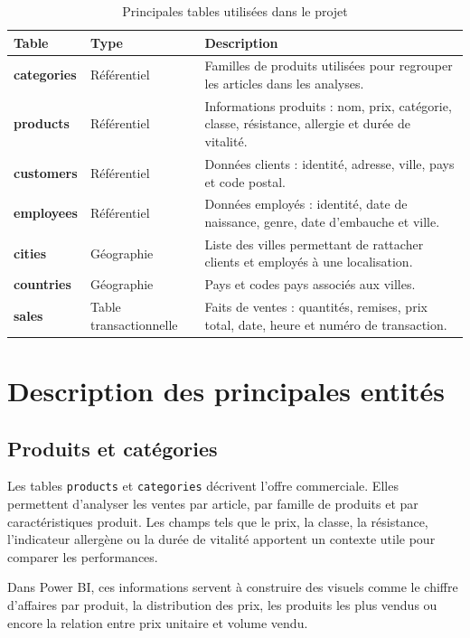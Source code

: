 \documentclass[12pt,a4paper,twoside]{report}
\begin{document}
\begin{table}[H]
\centering
{}
\begin{tabularx}{\textwidth}{>{\bfseries}p{3.1cm}p{3.2cm}X}
\toprule
\rowcolor{TableHeader}
\color{white}Table & \color{white}Type & \color{white}Description \\
\midrule
categories & Référentiel & Familles de produits utilisées pour regrouper les articles dans les analyses. \\
products & Référentiel & Informations produits : nom, prix, catégorie, classe, résistance, allergie et durée de vitalité. \\
customers & Référentiel & Données clients : identité, adresse, ville, pays et code postal. \\
employees & Référentiel & Données employés : identité, date de naissance, genre, date d'embauche et ville. \\
cities & Géographie & Liste des villes permettant de rattacher clients et employés à une localisation. \\
countries & Géographie & Pays et codes pays associés aux villes. \\
sales & Table transactionnelle & Faits de ventes : quantités, remises, prix total, date, heure et numéro de transaction. \\
\bottomrule
\end{tabularx}
\caption{Principales tables utilisées dans le projet}
\end{table}

\section{Description des principales entités}

\subsection{Produits et catégories}

Les tables \texttt{products} et \texttt{categories} décrivent l'offre commerciale. Elles permettent d'analyser les ventes par article, par famille de produits et par caractéristiques produit. Les champs tels que le prix, la classe, la résistance, l'indicateur allergène ou la durée de vitalité apportent un contexte utile pour comparer les performances.

Dans Power BI, ces informations servent à construire des visuels comme le chiffre d'affaires par produit, la distribution des prix, les produits les plus vendus ou encore la relation entre prix unitaire et volume vendu.
\end{document}
